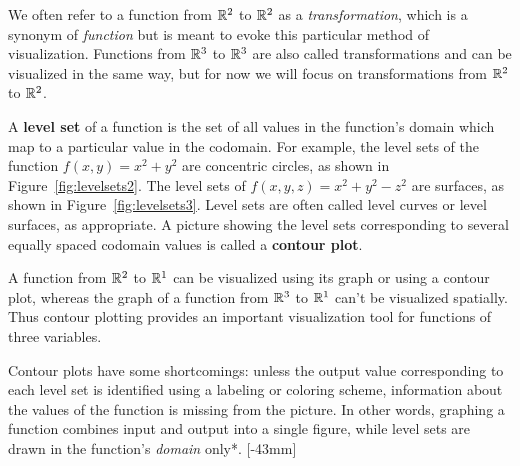 \documentclass{watsonbook}
\begin{document}
We often refer to a function from $\mathbb{R}^2$ to $\mathbb{R}^2$ as a
\textit{transformation}, which is a synonym of \textit{function}
but is meant to evoke this particular method of
visualization. Functions from $\mathbb{R}^3$ to $\mathbb{R}^3$ are also called
transformations and can be visualized in the same way, but for now we
will focus on transformations from $\mathbb{R}^2$ to $\mathbb{R}^2$.

A \textbf{level set} of a function is the set of all values in the
function's domain which map to a particular value in the codomain. For
example, the level sets of the function $f(x,y) = x^2 + y^2$ are
concentric circles, as shown in Figure~\ref{fig:levelsets2}. The level
sets of $f(x,y,z) = x^2 + y^2 - z^2$ are surfaces, as shown in
Figure~\ref{fig:levelsets3}. Level sets are often called level curves
or level surfaces, as appropriate. A picture showing the level sets
corresponding to several equally spaced codomain values is called a
\textbf{contour plot}.

A function from $\mathbb{R}^2$ to $\mathbb{R}^1$ can be visualized using its graph or
using a contour plot, whereas the graph of a function from $\mathbb{R}^3$ to
$\mathbb{R}^1$ can't be visualized spatially. Thus contour plotting provides
an important visualization tool for functions of three variables.

Contour plots have some shortcomings: unless the output value
corresponding to each level set is identified using a labeling or
coloring scheme, information about the values of the function is
missing from the picture. In other words, graphing a function combines
input and output into a single figure, while level sets are drawn in
the function's \textit{domain} only*. [-43mm]
\end{document}
